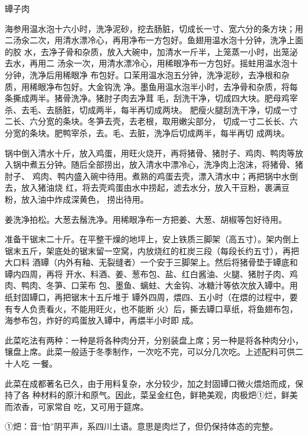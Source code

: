 \begin{recipe}{罈子肉}

\ingredients


\cooking

\step 海参用温水泡十六小时，洗净泥砂，挖去肠脏，切成长一寸、宽六分的条方块；用
二汤汆二次，用清水漂冷心，再用净布一方包好。鱼翅用温水泡十分钟，洗净上面的胶
水，去净子骨和杂质，放入大碗中，加清水一斤半，上笼蒸一小时，出笼泌去水，再用二
汤汆一次，用清水漂冷心，用稀眼净布一方包好。摇蛀用温水泡十分钟，洗净后用稀眼净
布包好。口茉用温水泡五分钟，洗净泥砂，去净根和杂质，用稀眼净布包好。大金钩洗
净。墨鱼用温水泡半小时，去净骨和杂质，将每条撕成两半。猪骨洗净。猪肘子肉去净茸
毛，刮洗干净，切成四大块。肥母鸡宰杀、去毛、去肠脏，切成两半，每半再切成两块。
肥瘦火腿刮洗干净，切成一寸二长、六分宽的条块。冬笋去壳，去老根，取用嫩尖部分，
切成一寸二长长、六分宽的条块。肥鸭宰杀，去。毛、去脏，洗净后切成两半，每半再切
成两块。

\step 锅中倒入清水十斤，放入鸡蛋，用旺火烧开，再将猪骨、猪肘子、鸡肉、鸭肉等放
入锅中煮五分钟。随后全部捞出，放入清水中漂冷心，洗净肉上泡沫，将猪骨、猪肘子、
鸡肉、鸭内盛入碗中待用。煮熟的鸡蛋去壳，漂入清水中；再把锅中水倒去，放入猪油烧
红，将去壳鸡蛋由水中捞起，滤去水分，放入干豆粉，裹满豆粉，放入油中炸成深黄色，
捞出待用。

\step 姜洗净拍松。大葱去鬚洗净。用稀眼净布一方把姜、大葱、胡椒等包好待用。

\step 准备干锯末二十斤。在平整干燥的地坪上，安上铁质三脚架（高五寸）。架内倒上
锯末五斤，架底处的锯末留一空窝，内放烧红的杠炭三段（每段长约五寸），再把大口料
酒罈（内外有釉、无裂缝者）一个安于三脚架上。然后将猪骨垫于罈底和罈内四周，再将
开水、料酒、姜、葱布包、盐、红白酱油、火腿、猪肘子肉、鸡肉、鸭肉、冬笋、口茉布
包、墨鱼、螭蛀、大金钩、冰糖汁等依次放入罈中。用纸封固罈口，再把锯末十五斤堆于
罈外四周，煨四、五小时（在煨的过程中，要有专人负责看火，不能用旺火，也不能断
火）后，撕去罈口草纸，将鱼翅布包，海参布包，炸好的鸡蛋放入罈中，再煨半小时即
成。

\step 此菜吃法有两种：一种是将各种肉分开，分别装盘上席；另一种是将各种肉分小，
镶盘上席。此菜一般适于冬季制作，一次吃不完，可以分几次吃。上述配料可供二十人吃
一餐。

\notes

此菜在成都著名已久，由于用料复杂，水分较少，加之封固罈口微火煨焙而成，保持了各
种材料的原汁和原气。因此，菜呈金红色，鲜艳美观，肉极𤆵①烂，鲜美而浓香，可家常自
吃，又可用于筵席。

①𤆵：音“怕”阴平声，系四川土语。意思是肉烂了，但仍保持体态的完整。

\end{recipe}

